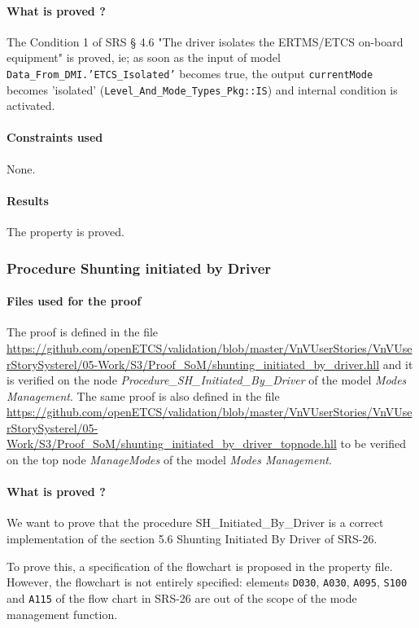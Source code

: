 \paragraph{What is proved ?}
The Condition 1 of SRS § 4.6 "The driver isolates the ERTMS/ETCS on-board equipment" is proved, ie; as soon as the input of \SCADE{} model \texttt{Data\_From\_DMI.'ETCS\_Isolated'} becomes true, the output \texttt{currentMode} becomes 'isolated' (\texttt{Level\_And\_Mode\_Types\_Pkg::IS}) and internal condition  is activated.


\paragraph{Constraints used}

None.

\paragraph{Results}

The property is proved.


\subsubsection{Procedure Shunting initiated by Driver}

\paragraph{Files used for the proof} The proof is defined in the file \url{https://github.com/openETCS/validation/blob/master/VnVUserStories/VnVUserStorySysterel/05-Work/S3/Proof_SoM/shunting_initiated_by_driver.hll} and it is verified on the node \emph{Procedure\_SH\_Initiated\_By\_Driver} of the \SCADE{} model \emph{Modes Management}. The same proof is also defined in the file \url{https://github.com/openETCS/validation/blob/master/VnVUserStories/VnVUserStorySysterel/05-Work/S3/Proof_SoM/shunting_initiated_by_driver_topnode.hll} to be verified on the top node \emph{ManageModes} of the \SCADE{} model \emph{Modes Management}.

\paragraph{What is proved ?}
We want to prove that the procedure SH\_Initiated\_By\_Driver is a
correct implementation of the section 5.6 Shunting Initiated By Driver of SRS-26.

To prove this, a specification of the flowchart is proposed in the
property file. However, the flowchart is not entirely specified:
elements \texttt{D030}, \texttt{A030}, \texttt{A095}, \texttt{S100} and
\texttt{A115} of the flow chart in SRS-26 are out of the scope of the mode management function.

